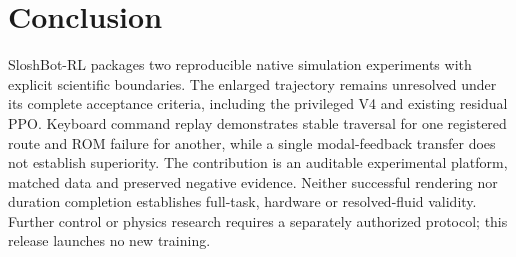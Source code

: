 \section{Conclusion}
SloshBot-RL packages two reproducible native simulation experiments with explicit scientific boundaries. The enlarged trajectory remains unresolved under its complete acceptance criteria, including the privileged V4 and existing residual PPO. Keyboard command replay demonstrates stable traversal for one registered route and ROM failure for another, while a single modal-feedback transfer does not establish superiority. The contribution is an auditable experimental platform, matched data and preserved negative evidence. Neither successful rendering nor duration completion establishes full-task, hardware or resolved-fluid validity. Further control or physics research requires a separately authorized protocol; this release launches no new training.
